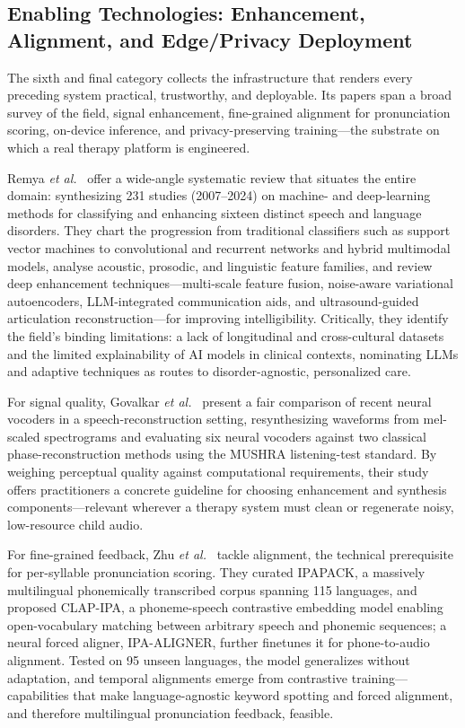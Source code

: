 \documentclass[conference]{IEEEtran}
\begin{document}
\subsection{Enabling Technologies: Enhancement, Alignment, and Edge/Privacy Deployment}
The sixth and final category collects the infrastructure that renders every preceding system practical, trustworthy, and deployable. Its papers span a broad survey of the field, signal enhancement, fine-grained alignment for pronunciation scoring, on-device inference, and privacy-preserving training---the substrate on which a real therapy platform is engineered.

Remya \textit{et al.}~\cite{ref20} offer a wide-angle systematic review that situates the entire domain: synthesizing 231 studies (2007--2024) on machine- and deep-learning methods for classifying and enhancing sixteen distinct speech and language disorders. They chart the progression from traditional classifiers such as support vector machines to convolutional and recurrent networks and hybrid multimodal models, analyse acoustic, prosodic, and linguistic feature families, and review deep enhancement techniques---multi-scale feature fusion, noise-aware variational autoencoders, LLM-integrated communication aids, and ultrasound-guided articulation reconstruction---for improving intelligibility. Critically, they identify the field's binding limitations: a lack of longitudinal and cross-cultural datasets and the limited explainability of AI models in clinical contexts, nominating LLMs and adaptive techniques as routes to disorder-agnostic, personalized care.

For signal quality, Govalkar \textit{et al.}~\cite{ref21} present a fair comparison of recent neural vocoders in a speech-reconstruction setting, resynthesizing waveforms from mel-scaled spectrograms and evaluating six neural vocoders against two classical phase-reconstruction methods using the MUSHRA listening-test standard. By weighing perceptual quality against computational requirements, their study offers practitioners a concrete guideline for choosing enhancement and synthesis components---relevant wherever a therapy system must clean or regenerate noisy, low-resource child audio.

For fine-grained feedback, Zhu \textit{et al.}~\cite{ref22} tackle alignment, the technical prerequisite for per-syllable pronunciation scoring. They curated IPAPACK, a massively multilingual phonemically transcribed corpus spanning 115 languages, and proposed CLAP-IPA, a phoneme-speech contrastive embedding model enabling open-vocabulary matching between arbitrary speech and phonemic sequences; a neural forced aligner, IPA-ALIGNER, further finetunes it for phone-to-audio alignment. Tested on 95 unseen languages, the model generalizes without adaptation, and temporal alignments emerge from contrastive training---capabilities that make language-agnostic keyword spotting and forced alignment, and therefore multilingual pronunciation feedback, feasible.
\end{document}
